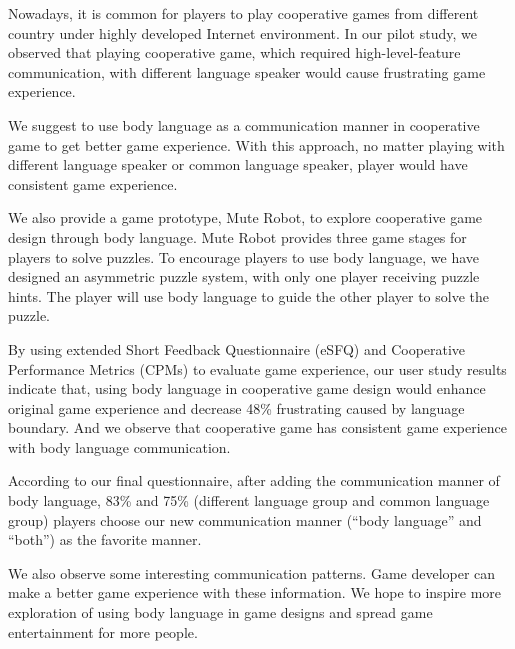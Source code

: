 Nowadays, it is common for players to play cooperative games from different country under highly developed Internet environment. 
In our pilot study, we observed that playing cooperative game, which required high-level-feature communication, with different language speaker would cause frustrating game experience.

We suggest to use body language as a communication manner in cooperative game to get better game experience. With this approach, no matter playing with different language speaker or common language speaker, player would have consistent game experience. 

We also provide a game prototype, Mute Robot, to explore cooperative game design through body language. Mute Robot provides three game stages for players to solve puzzles.
To encourage players to use body language, we have designed an asymmetric puzzle system, with only one player receiving puzzle hints. The player will use body language to guide the other player to solve the puzzle.

By using extended Short Feedback Questionnaire (eSFQ)\cite{eSFQ} and Cooperative Performance Metrics (CPMs)\cite{CPMs} to evaluate game experience, our user study results indicate that, using body language in cooperative game design would enhance original game experience and decrease 48\% frustrating caused by language boundary. And we observe that cooperative game has consistent game experience with body language communication.

According to our final questionnaire, after adding the communication manner of body language, 83\% and 75\% (different language group and common language group) players choose our new communication manner (``body language'' and ``both'') as the favorite manner. 

We also observe some interesting communication patterns. Game developer can make a better game experience with these information. We hope to inspire more exploration of using body language in game designs and spread game entertainment for more people.



